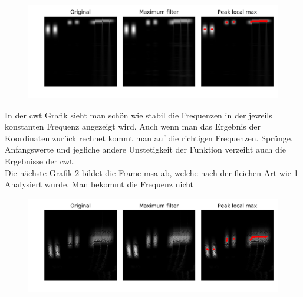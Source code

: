 \begin{figure}[!ht]
	\centering
	\includegraphics[width=\linewidth]{papers/autotune/sections/frames/images/cwtmaxima.jpg}
	\label{fig:cwt_max}
\end{figure}%
In der cwt Grafik sieht man schön wie stabil die Frequenzen in der jeweils konstanten Frequenz angezeigt wird. Auch wenn man das Ergebnis der Koordinaten zurück rechnet kommt man auf die richtigen Frequenzen. Sprünge, Anfangswerte und jegliche andere Unstetigkeit der Funktion verzeiht auch die Ergebnisse der cwt.
\\
Die nächste Grafik \ref{fig:msa_max} bildet die Frame-msa ab, welche nach der fleichen Art wie \ref{fig:cwt_max} Analysiert wurde. Man bekommt die Frequenz nicht 
\begin{figure}[!ht]
	\centering
	\includegraphics[width=\linewidth]{papers/autotune/sections/frames/images/dwtmaxima.jpg}
	\label{fig:msa_max}
\end{figure}%


